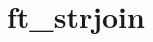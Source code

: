\chapter{ft\+\_\+strjoin}
\hypertarget{md_Documentation_2ft__strjoin}{}\label{md_Documentation_2ft__strjoin}
